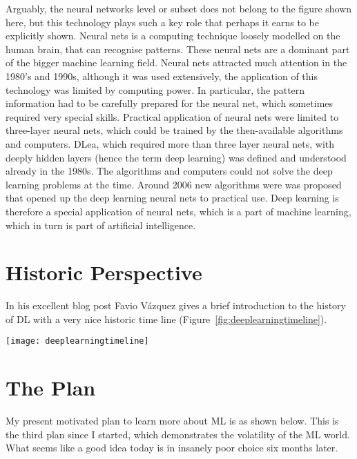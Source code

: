 Arguably, the neural networks level or subset does not belong to the figure shown here, but this technology plays such a key role that perhaps it earns to be explicitly shown.  Neural nets is a computing technique loosely modelled on the human brain, that can  recognise patterns.  These neural nets are a dominant part of the bigger machine learning field. Neural nets attracted much attention in the 1980's and 1990s, although it was used extensively, the application of this technology was limited by computing power.  In particular, the pattern information had to be carefully prepared for the neural net, which sometimes required very special skills. Practical application of neural nets were limited to three-layer neural nets, which could be trained by the then-available algorithms and computers.  \ac{DLea}\cite{WikiPediaDeepLearning2019}, which required more than three layer neural nets, with deeply hidden layers (hence the term deep learning) was defined and understood already in the 1980s.  The algorithms and computers could not solve the deep learning problems at the time.   Around 2006 new algorithms were was proposed that opened up the deep learning neural nets to practical use.
Deep learning is therefore a special application of neural nets, which is a part of machine learning, which in turn is part of artificial intelligence.




\section*{Historic Perspective}

In his excellent blog post \cite{Vazquez2018} Favio V\'{a}zquez gives a brief introduction to the history of \ac{DL} with a very nice historic time line (Figure~\ref{fig:deeplearningtimeline}).

\begin{figure*}[tph]
\texttt{[image: deeplearningtimeline]}
\caption{Favio V\'{a}zquez's \ac{DL} time line}
\label{fig:deeplearningtimeline}
\end{figure*}




\section*{The Plan}

My present motivated plan to learn more about \ac{ML} is as shown below. This is the third plan since I started, which demonstrates the volatility of the \ac{ML} world. What seems like a good idea today is in insanely poor choice six months later.

